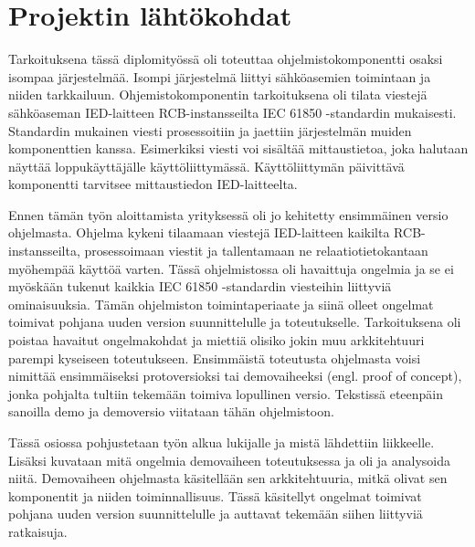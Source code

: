 \chapter{Projektin lähtökohdat}
\label{ch:projektin-lähtökohdat}
Tarkoituksena tässä diplomityössä oli toteuttaa ohjelmistokomponentti osaksi isompaa järjestelmää. Isompi järjestelmä liittyi sähköasemien toimintaan ja niiden tarkkailuun. Ohjemistokomponentin tarkoituksena oli tilata viestejä sähköaseman IED-laitteen RCB-instansseilta IEC 61850 -standardin mukaisesti. Standardin mukainen viesti prosessoitiin ja jaettiin järjestelmän muiden komponenttien kanssa. Esimerkiksi viesti voi sisältää mittaustietoa, joka halutaan näyttää loppukäyttäjälle käyttöliittymässä. Käyttöliittymän päivittävä komponentti tarvitsee mittaustiedon IED-laitteelta.

Ennen tämän työn aloittamista yrityksessä oli jo kehitetty ensimmäinen versio ohjelmasta. Ohjelma kykeni tilaamaan viestejä IED-laitteen kaikilta RCB-instansseilta, prosessoimaan viestit ja tallentamaan ne relaatiotietokantaan myöhempää käyttöä varten. Tässä ohjelmistossa oli havaittuja ongelmia ja se ei myöskään tukenut kaikkia IEC 61850 -standardin viesteihin liittyviä ominaisuuksia. Tämän ohjelmiston toimintaperiaate ja siinä olleet ongelmat toimivat pohjana uuden version suunnittelulle ja toteutukselle. Tarkoituksena oli poistaa havaitut ongelmakohdat ja miettiä olisiko jokin muu arkkitehtuuri parempi kyseiseen toteutukseen. Ensimmäistä toteutusta ohjelmasta voisi nimittää ensimmäiseksi protoversioksi tai demovaiheeksi (engl. proof of concept), jonka pohjalta tultiin tekemään toimiva lopullinen versio. Tekstissä eteenpäin sanoilla demo ja demoversio viitataan tähän ohjelmistoon.

Tässä osiossa pohjustetaan työn alkua lukijalle ja mistä lähdettiin liikkeelle. Lisäksi kuvataan mitä ongelmia demovaiheen toteutuksessa ja oli ja analysoida niitä. Demovaiheen ohjelmasta käsitellään sen arkkitehtuuria, mitkä olivat sen komponentit ja niiden toiminnallisuus. Tässä käsitellyt ongelmat toimivat pohjana uuden version suunnittelulle ja auttavat tekemään siihen liittyviä ratkaisuja.


